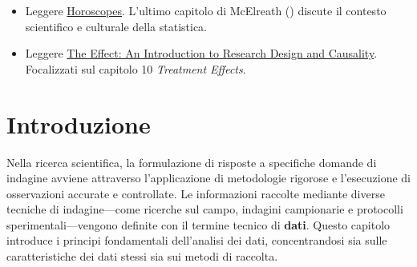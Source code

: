 \documentclass[
  letterpaper,
]{krantz}
\providecommand{\tightlist}{%
  \setlength{\itemsep}{0pt}\setlength{\parskip}{0pt}}\usepackage{longtable,booktabs,array}
\begin{document}
\begin{tcolorbox}[enhanced jigsaw, toprule=.15mm, breakable, bottomrule=.15mm, colback=white, colbacktitle=quarto-callout-tip-color!10!white, left=2mm, toptitle=1mm, colframe=quarto-callout-tip-color-frame, coltitle=black, opacitybacktitle=0.6, bottomtitle=1mm, titlerule=0mm, leftrule=.75mm, opacityback=0, rightrule=.15mm, title=\textcolor{quarto-callout-tip-color}{\faLightbulb}\hspace{0.5em}{Prerequisiti}, arc=.35mm]

\begin{itemize}
\tightlist
\item
  Leggere \href{../../figures/horoscopes.pdf}{Horoscopes}. L'ultimo
  capitolo di McElreath ()
  discute il contesto scientifico e culturale della statistica.
\item
  Leggere \href{https://theeffectbook.net}{The Effect: An Introduction
  to Research Design and Causality}. Focalizzati sul capitolo 10
  \emph{Treatment Effects}.
\end{itemize}

\end{tcolorbox}

\section*{Introduzione}\label{introduzione}


Nella ricerca scientifica, la formulazione di risposte a specifiche
domande di indagine avviene attraverso l'applicazione di metodologie
rigorose e l'esecuzione di osservazioni accurate e controllate. Le
informazioni raccolte mediante diverse tecniche di indagine---come
ricerche sul campo, indagini campionarie e protocolli
sperimentali---vengono definite con il termine tecnico di \textbf{dati}.
Questo capitolo introduce i principi fondamentali dell'analisi dei dati,
concentrandosi sia sulle caratteristiche dei dati stessi sia sui metodi
di raccolta.
\end{document}
